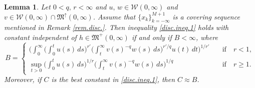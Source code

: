 \documentclass[12pt]{amsart}
\theoremstyle{plain}
\newtheorem{lem}[thm]{Lemma}
\theoremstyle{definition}
\numberwithin{thm}{section}
\numberwithin{equation}{section}
\begin{document}
\begin{lem}\label{lem.1.7}
	Let $0 < q,\, r < \infty$ and  $u,\,w \in {\mathcal W}(0,\infty)$ and $v \in {\mathcal W}(0,\infty) \cap {{\mathfrak M}}^{\uparrow}(0,\infty)$. Assume that $\{x_k\}_{k=-\infty}^{M + 1}$ is a covering sequence mentioned in Remark \ref{rem.disc.}.
	Then inequality \eqref{disc.ineq.1}	holds with constant independent of $h \in {\mathfrak M}^+(0,\infty)$ if and only if $B < \infty$, where
	$$
	B = 
	\begin{cases}
	\bigg( \int_0^{\infty} \bigg( \int_0^t u(s)\,ds\bigg)^{r'} \bigg( \int_t^{\infty} v(s)^{-q} w(s)\,ds \bigg)^{ r' / q}u(t)\,dt \bigg)^{1/r'}  & \quad \mbox{if} \quad r < 1, \\
	\sup_{t > 0} \bigg( \int_0^t u(s)\,ds \bigg)^{1 / r} \bigg( \int_t^{\infty} v(s)^{-q} w(s)\,ds \bigg)^{ 1 / q}  & \quad \mbox{if} \quad r \ge 1.
	\end{cases}
	$$
	Moreover, if $C$ is the best constant in \eqref{disc.ineq.1}, then $C \approx B$.	
\end{lem}
\end{document}
